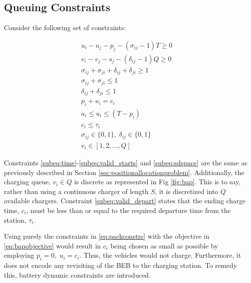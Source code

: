 \documentclass[letterpaper, 10pt, conference]{IEEEtran}
\begin{document}
\subsection{Queuing Constraints}
\noindent
Consider the following set of constraints:

\begin{subequations}
\label{eq:packconstrs}
\begin{align}
    u_i - u_j - p_j - (\sigma_{ij} - 1)T \geq 0                      \label{subeq:time}         \\
    v_i - v_j - s_j - (\delta_{ij} - 1)Q \geq 0                      \label{subeq:space}        \\
    \sigma_{ij} + \sigma_{ji} + \delta_{ij} + \delta_{ji} \geq 1     \label{subeq:valid_pos}    \\
    \sigma_{ij} + \sigma_{ji} \leq 1                                 \label{subeq:sigma}        \\
    \delta_{ij} + \delta_{ji} \leq 1                                 \label{subeq:delta}        \\
    p_i + u_i = c_i                                                  \label{subeq:detach}       \\
    a_i \leq u_i \leq (T - p_i)                                      \label{subeq:valid_starts} \\
    c_i \leq \tau_i                                                  \label{subeq:valid_depart} \\
    \sigma_{ij} \in \{0,1\},\;\delta_{ij} \in \{0,1\}                \label{subeq:sdspace}      \\
    v_i \in [1,2, ... , Q]                                          \label{subeq:vspace}
\end{align}
\end{subequations}

Constraints \eqref{subeq:time}-\eqref{subeq:valid_starts} and \eqref{subeq:sdspace} are the same as previously described
in Section \ref{sec:positionallocationproblem}. Additionally, the charging queue, $v_i \in Q$ is discrete as represented
in Fig \ref{fig:bap}. This is to say, rather than using a continuous charger of length $S$, it is discretized into $Q$
available chargers. Constraint \eqref{subeq:valid_depart} states that the ending charge time, $c_i$, must be less than
or equal to the required departure time from the station, $\tau_i$.

Using purely the constraints in \eqref{eq:packconstrs} with the objective in \eqref{eq:bapobjective} would result in
$c_i$ being chosen as small as possible by employing $p_i = 0,\; u_i = c_i$. Thus, the vehicles would not charge.
Furthermore, it does not encode any revisiting of the BEB to the charging station. To remedy this, battery dynamic
constraints are introduced.
\end{document}
